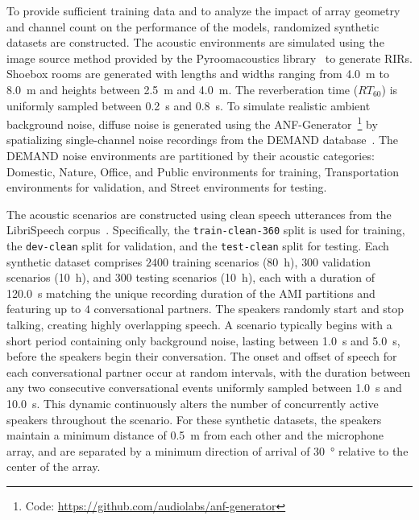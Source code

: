 \documentclass[lettersize,journal]{IEEEtran}
\begin{document}
To provide sufficient training data and to analyze the impact of array geometry and channel count on the performance of the models,
randomized synthetic datasets are constructed.
The acoustic environments are simulated using the image source method
provided by the Pyroomacoustics library~\cite{scheibler2018pyroomacoustics} to generate \glspl{RIR}.
Shoebox rooms are generated with lengths and widths ranging from \SI{4.0}{\meter} to \SI{8.0}{\meter}
and heights between \SI{2.5}{\meter} and \SI{4.0}{\meter}.
The reverberation time ($RT_{60}$) is uniformly sampled between \SI{0.2}{\second} and \SI{0.8}{\second}.
To simulate realistic ambient background noise, diffuse noise is generated using the
ANF-Generator~\cite{habets_ANFgenerator_2021}\footnote{Code: \url{https://github.com/audiolabs/anf-generator}}
by spatializing single-channel noise recordings from the DEMAND database~\cite{thiemann2013demand}.
The DEMAND noise environments are partitioned by their acoustic categories:
Domestic, Nature, Office, and Public environments for training,
Transportation environments for validation,
and Street environments for testing.

The acoustic scenarios are constructed using clean speech utterances
from the LibriSpeech corpus~\cite{panayotov2015librispeech}.
Specifically, the \texttt{train-clean-360} split is used for training,
the \texttt{dev-clean} split for validation, and the \texttt{test-clean} split for testing.
Each synthetic dataset comprises $2400$ training scenarios (\SI{80}{\hour}), $300$ validation scenarios (\SI{10}{\hour}), and $300$ testing scenarios (\SI{10}{\hour}), each with a duration of \SI{120.0}{\second} matching the unique recording duration of the \gls{AMI} partitions and featuring up to $4$ conversational partners.
The speakers randomly start and stop talking, creating highly overlapping speech.
A scenario typically begins with a short period containing only background noise,
lasting between \SI{1.0}{\second} and \SI{5.0}{\second}, before the speakers begin their conversation.
The onset and offset of speech for each conversational partner occur at random intervals,
with the duration between any two consecutive conversational events uniformly sampled
between \SI{1.0}{\second} and \SI{10.0}{\second}. This dynamic
continuously alters the number of concurrently active speakers throughout the scenario.
For these synthetic datasets, the speakers maintain a minimum distance of \SI{0.5}{\meter}
from each other and the microphone array, and are separated by a minimum direction
of arrival of \SI{30}{\degree} relative to the center of the array.
\end{document}
